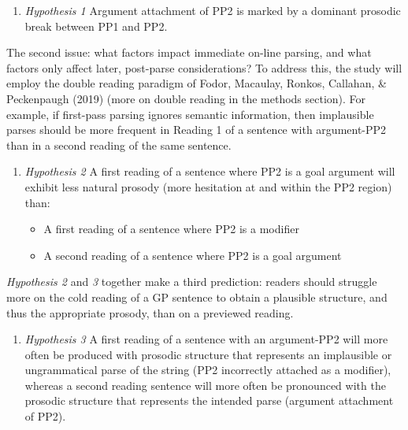 \documentclass[12pt,oneside]{book}
\providecommand{\tightlist}{%
  \setlength{\itemsep}{0pt}\setlength{\parskip}{0pt}}
\begin{document}
\begin{enumerate}
\def\labelenumi{(\arabic{enumi})}
\setcounter{enumi}{33}
\tightlist
\item
  \emph{Hypothesis 1}
  Argument attachment of PP2 is marked by a dominant prosodic break between PP1 and PP2.
\end{enumerate}

The second issue: what factors impact immediate on-line parsing, and what factors only affect later, post-parse considerations? To address this, the study will employ the double reading paradigm of Fodor, Macaulay, Ronkos, Callahan, \& Peckenpaugh (2019) (more on double reading in the methods section). For example, if first-pass parsing ignores semantic information, then implausible parses should be more frequent in Reading 1 of a sentence with argument-PP2 than in a second reading of the same sentence.

\begin{enumerate}
\def\labelenumi{(\arabic{enumi})}
\setcounter{enumi}{34}
\tightlist
\item
  \emph{Hypothesis 2}
  A first reading of a sentence where PP2 is a goal argument will exhibit less natural prosody (more hesitation at and within the PP2 region) than:

  \begin{itemize}
  \tightlist
  \item
    A first reading of a sentence where PP2 is a modifier
  \item
    A second reading of a sentence where PP2 is a goal argument
  \end{itemize}
\end{enumerate}

\emph{Hypothesis 2} and \emph{3} together make a third prediction: readers should struggle more on the cold reading of a GP sentence to obtain a plausible structure, and thus the appropriate prosody, than on a previewed reading.

\begin{enumerate}
\def\labelenumi{(\arabic{enumi})}
\setcounter{enumi}{35}
\tightlist
\item
  \emph{Hypothesis 3}
  A first reading of a sentence with an argument-PP2 will more often be produced with prosodic structure that represents an implausible or ungrammatical parse of the string (PP2 incorrectly attached as a modifier), whereas a second reading sentence will more often be pronounced with the prosodic structure that represents the intended parse (argument attachment of PP2).
\end{enumerate}
\end{document}
